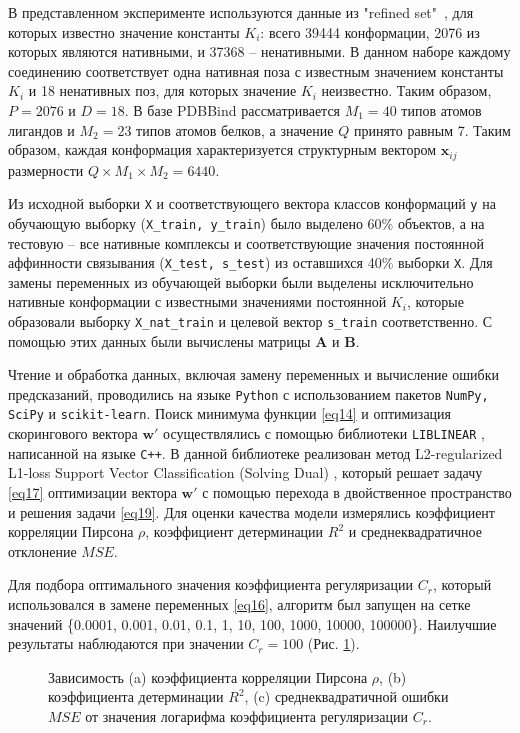 \documentclass[preprint,12pt,3p]{elsarticle}
\begin{document}
В представленном эксперименте используются данные из "refined set"\ , для которых известно значение константы $K_i$: всего 39444 конформации, 2076 из которых являются нативными, и 37368 -- ненативными. В данном наборе каждому соединению соответствует одна нативная поза с известным значением константы $K_i$ и 18 ненативных поз, для которых значение $K_i$ неизвестно. Таким образом, $P=2076$ и $D=18$. В базе PDBBind рассматривается $M_1=40$ типов атомов лигандов и $M_2=23$ типов атомов белков, а значение $Q$ принято равным 7. Таким образом, каждая конформация характеризуется структурным вектором $\mathbf{x}_{ij}$ размерности $Q\times M_1\times M_2=6440$.

Из исходной выборки \texttt{X} и соответствующего вектора классов конформаций \texttt{y} на обучающую выборку (\texttt{X\_train, y\_train}) было выделено 60\% объектов,  а на тестовую -- все нативные комплексы и соответствующие значения постоянной аффинности связывания (\texttt{X\_test, s\_test}) из оставшихся 40\% выборки \texttt{X}. Для замены переменных из обучающей выборки были выделены исключительно нативные конформации с известными значениями постоянной $K_i$, которые образовали выборку \texttt{X\_nat\_train} и целевой вектор \texttt{s\_train} соответственно. С помощью этих данных были вычислены матрицы $\mathbf{A}$ и $\mathbf{B}$.

Чтение и обработка данных, включая замену переменных и вычисление ошибки предсказаний, проводились на языке \texttt{Python} с использованием пакетов \texttt{NumPy, SciPy} и \texttt{scikit-learn}. Поиск минимума функции \eqref{eq14} и оптимизация скорингового вектора $\mathbf{w}'$ осуществлялись с помощью библиотеки \texttt{LIBLINEAR} \cite{liblinear}, написанной на языке \texttt{C++}. В данной библиотеке реализован метод L2-regularized L1-loss Support Vector Classification (Solving Dual) \cite{dualSVM}, который решает задачу \eqref{eq17} оптимизации вектора $\mathbf{w}'$ с помощью перехода в двойственное пространство и решения задачи \eqref{eq19}. Для оценки качества модели измерялись коэффициент корреляции Пирсона $\rho$, коэффициент детерминации $R^2$ и среднеквадратичное отклонение $MSE$.

Для подбора оптимального значения коэффициента регуляризации $C_r$, который использовался в замене переменных \eqref{eq16}, алгоритм был запущен на сетке значений \{0.0001, 0.001, 0.01, 0.1, 1, 10, 100, 1000, 10000, 100000\}. Наилучшие результаты наблюдаются при значении $C_r = 100$ (Рис. \ref{fig1}).

\begin{figure}[h]
    \centering
    \captionsetup{justification=centering}
    \caption{Зависимость (a) коэффициента корреляции Пирсона $\rho$, (b) коэффициента детерминации $R^2$, (c) среднеквадратичной ошибки $MSE$ от значения логарифма коэффициента регуляризации $C_r$.}
    \label{fig1}
\end{figure}
\end{document}
